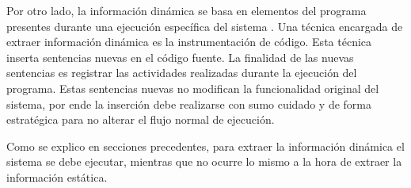 \documentclass[a4paper,12pt]{report}
\begin{document}



Por otro lado, la información dinámica se basa en elementos del programa presentes durante una ejecución específica del sistema \cite{THBE99}. Una técnica encargada de extraer información dinámica es la instrumentación de código. Esta técnica inserta sentencias nuevas en el código fuente. La finalidad de las nuevas sentencias es registrar las actividades realizadas durante la ejecución del programa. 
Estas sentencias nuevas no modifican la funcionalidad original del sistema, por ende la inserción debe realizarse con sumo cuidado y de forma estratégica para no alterar el flujo normal de ejecución.

Como se explico en secciones precedentes, para extraer la información dinámica el sistema se debe ejecutar, mientras que no ocurre lo mismo a la hora de extraer la información estática.
\end{document}

